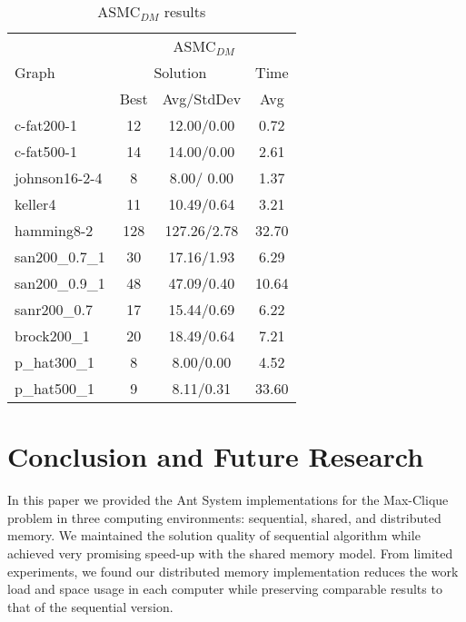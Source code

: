 \documentclass[11pt]{article}
\begin{document}
\begin{table*}[h!]
\caption{ASMC$_{DM}$ results\label{tab:distributed1}}
\begin{footnotesize}
\begin{center}
\begin{tabular}{|l||c|c|c|}
\hline
&\multicolumn{3}{|c|}{ASMC$_{DM}$}\\
\cline{2-4}
Graph&\multicolumn{2}{|c|}{Solution}&Time\\
\cline{2-3}
                & Best  & Avg/StdDev     	&  Avg     \\

\hline				            				       
c-fat200-1    	  & 12 	& 12.00/0.00 	& 0.72     \\
c-fat500-1        & 14  & 14.00/0.00    & 2.61     \\
\hline
johnson16-2-4 	  & 8   & 8.00/	0.00 	& 1.37     \\
\hline
keller4 	      & 11 	& 10.49/0.64 	& 3.21     \\
\hline
hamming8-2 	      & 128 & 127.26/2.78 	& 32.70    \\
\hline
san200\_0.7\_1 	  & 30 	& 17.16/1.93 	& 6.29     \\
san200\_0.9\_1 	  & 48 	& 47.09/0.40 	& 10.64     \\
\hline
sanr200\_0.7 	  & 17 	& 15.44/0.69 	& 6.22     \\
\hline
brock200\_1 	  & 20 	& 18.49/0.64 	& 7.21     \\
\hline
p\_hat300\_1 	  & 8 	& 8.00/0.00 	& 4.52     \\
p\_hat500\_1 	  & 9 	& 8.11/0.31 	& 33.60    \\
\hline
\end{tabular}
\end{center}
\end{footnotesize}
\end{table*}


\section{Conclusion and Future Research}\label{conclusion}

In this paper we provided the Ant System implementations for the Max-Clique problem in three computing environments: sequential, shared, and distributed memory.  We maintained the solution quality of sequential algorithm while achieved very promising speed-up with the shared memory model. From limited experiments, we found our distributed memory implementation reduces the work load and space usage in each computer while preserving comparable results to that of the sequential version.
\end{document}
